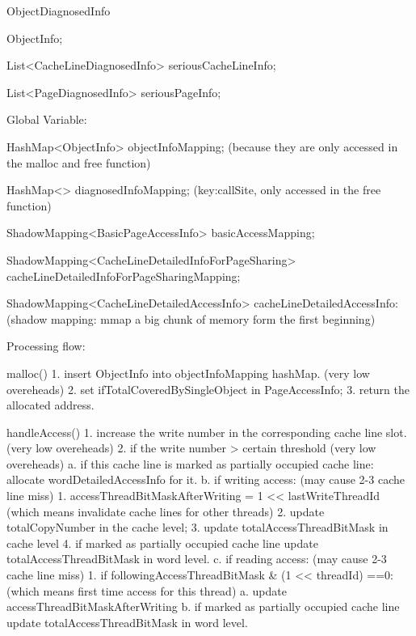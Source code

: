         ObjectDiagnosedInfo {
            ObjectInfo;

            List<CacheLineDiagnosedInfo> seriousCacheLineInfo;

            List<PageDiagnosedInfo> seriousPageInfo;
        }


Global Variable:

        HashMap<ObjectInfo> objectInfoMapping; (because they are only accessed in the malloc and free function)

        HashMap<> diagnosedInfoMapping; (key:callSite, only accessed in the free function)

        ShadowMapping<BasicPageAccessInfo> basicAccessMapping;

        ShadowMapping<CacheLineDetailedInfoForPageSharing> cacheLineDetailedInfoForPageSharingMapping;

        ShadowMapping<CacheLineDetailedAccessInfo> cacheLineDetailedAccessInfo:(shadow mapping: mmap a big chunk of memory form the first beginning)


Processing flow:

        malloc(){
            1. insert ObjectInfo into objectInfoMapping hashMap.   (very low overeheads)
            2. set ifTotalCoveredBySingleObject in PageAccessInfo;
            3. return the allocated address.
        }

        handleAccess(){
            1. increase the write number in the corresponding cache line slot.  (very low overeheads)
            2. if the write number > certain threshold                          (very low overeheads)
                      a. if this cache line is marked as partially occupied cache line:
                            allocate wordDetailedAccessInfo for it.
                      b. if writing access:                  (may cause 2-3 cache line miss)
                            1. accessThreadBitMaskAfterWriting = 1 << lastWriteThreadId (which means invalidate cache lines for other threads)
                            2. update totalCopyNumber in the cache level;
                            3. update totalAccessThreadBitMask in cache level
                            4. if marked as partially occupied cache line
                                    update totalAccessThreadBitMask in word level.
                      c. if reading access:                   (may cause 2-3 cache line miss)
                            1. if followingAccessThreadBitMask & (1 << threadId) ==0: (which means first time access for this thread)
                                    a. update accessThreadBitMaskAfterWriting
                                    b. if marked as partially occupied cache line
                                            update totalAccessThreadBitMask in word level.
        }

